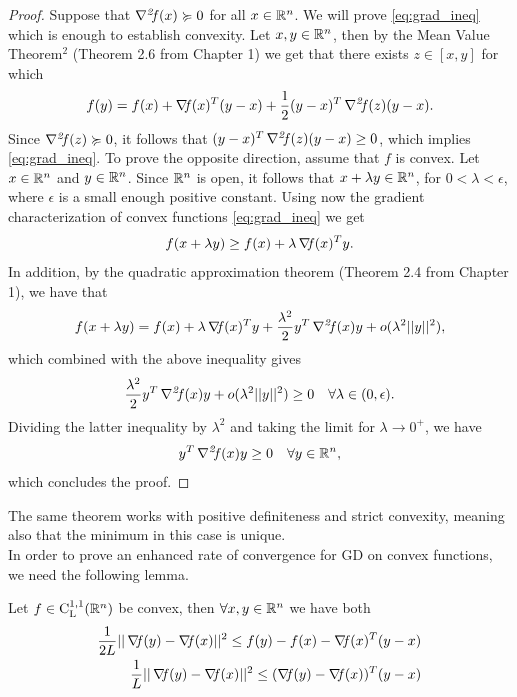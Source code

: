 \documentclass[10pt,a4paper]{article}
\begin{document}
\begin{proof}
	Suppose that $\operatorname*{\mathit{\nabla^2 \!f}}(x) \succcurlyeq 0$ for all $x \in \mathbb{R}^n$. We will prove \eqref{eq:grad_ineq} which is enough to establish convexity. Let $x,y\in \mathbb{R}^n$, then by the Mean Value Theorem$^2$ (Theorem 2.6 from Chapter 1) we get that there exists $z\in[x,y]$ for which 
	\begin{equation}\label{eq:mvt2_app}
		f(y) = f(x)+ \operatorname*{\mathit{\nabla \!f}} (x)^T(y-x) +\frac{1}{2}(y-x)^T\operatorname*{\mathit{\nabla^2 \!f}}(z)(y-x).
	\end{equation}
	Since $\operatorname*{\mathit{\nabla^2 \!f}}(z) \succcurlyeq 0$, it follows that $(y-x)^T\operatorname*{\mathit{\nabla^2 \!f}}(z)(y-x)\geq0$, which implies \eqref{eq:grad_ineq}.
	To prove the opposite direction, assume that $f$ is convex. Let $x\in \mathbb{R}^n$ and $y\in \mathbb{R}^n$. Since $\mathbb{R}^n$ is open, it follows that $x+\lambda y \in \mathbb{R}^n$, for $0<\lambda<\epsilon$, where $\epsilon$ is a small enough positive constant. Using now the gradient characterization of convex functions \eqref{eq:grad_ineq} we get 
	\begin{equation*}
		f(x+\lambda y) \geq f(x) + \lambda\operatorname*{\mathit{\nabla \!f}}(x)^Ty.
	\end{equation*}
	In addition, by the quadratic approximation theorem (Theorem 2.4 from Chapter 1), we have that 
	\begin{equation*}
		f(x+\lambda y) = f(x) + \lambda \operatorname*{\mathit{\nabla \!f}}(x)^Ty + \frac{\lambda^2}{2}y^T\operatorname*{\mathit{\nabla^2 \!f}}(x)y + o(\lambda^2||y||^2),
	\end{equation*}
	which combined with the above inequality gives 
	\begin{equation*}
		\frac{\lambda^2}{2}y^T\operatorname*{\mathit{\nabla^2 \!f}}(x)y + o(\lambda^2||y||^2) \geq 0 \quad \forall \lambda\in (0,\epsilon).
	\end{equation*}
	Dividing the latter inequality by $\lambda^2$ and taking the limit for $\lambda\to 0^+$, we have 
	\begin{equation*}
		y^T\operatorname*{\mathit{\nabla^2 \!f}}(x)y \geq 0 \quad \forall y \in \mathbb{R}^n,
	\end{equation*}
	which concludes the proof.
\end{proof}
The same theorem works with positive definiteness and strict convexity, meaning also that the minimum in this case is unique.\\
In order to prove an enhanced rate of convergence for GD on convex functions, we need the following lemma.
\begin{lemma}[Co-coercivity]
	Let $f\in \mathord{\mathrm{C^{1,1}_{L}}}(\mathbb{R}^n)$ be convex, then $\forall x, y \in \mathbb{R}^n$ we have both
	\begin{align}
		\frac{1}{2L} ||\operatorname*{\mathit{\nabla \!f}}(y)-\operatorname*{\mathit{\nabla \!f}}(x)||^2 \leq f(y)-f(x) -\operatorname*{\mathit{\nabla \!f}}(x)^T(y-x)\label{eq:pre_cocoercivity}\\
		\frac{1}{L} ||\operatorname*{\mathit{\nabla \!f}}(y)-\operatorname*{\mathit{\nabla \!f}}(x)||^2 \leq (\operatorname*{\mathit{\nabla \!f}}(y)-\operatorname*{\mathit{\nabla \!f}}(x))^T(y-x)\label{eq:cocoercivity}
	\end{align}
\end{lemma}
\end{document}
